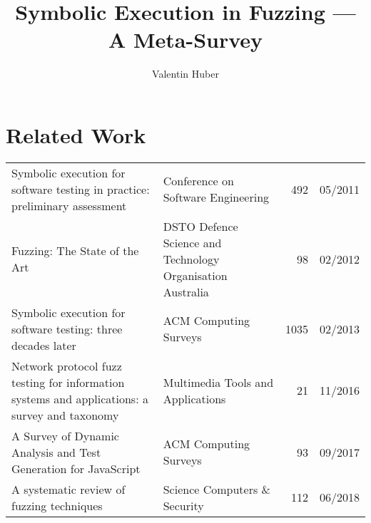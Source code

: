 \documentclass{article}
\title{Symbolic Execution in Fuzzing — A Meta-Survey}
\author{Valentin Huber}
\begin{document}


\maketitle
\tableofcontents
\pagebreak

\section{Related Work}
\begin{longtable}{|P{0.44\textwidth}|P{0.32\textwidth}|r|r|}
    \hline
                                                                                                                            &                                              &  &  \\\hline
    \endhead
    Symbolic execution for software testing in practice: preliminary assessment\cite{PreliminaryAssessment}                                       & Conference on Software Engineering                         & 492            & 05/2011       \\\hline
    Fuzzing: The State of the Art\cite{FuzzingTheStateOfTheArt}                                                                                   & DSTO Defence Science and Technology Organisation Australia & 98             & 02/2012       \\\hline
    Symbolic execution for software testing: three decades later\cite{ReviewThreeDecades}                                                         & ACM Computing Surveys                                      & 1035           & 02/2013       \\\hline
    Network protocol fuzz testing for information systems and applications: a survey and taxonomy\cite{Network}                                   & Multimedia Tools and Applications                          & 21             & 11/2016       \\\hline
    A Survey of Dynamic Analysis and Test Generation for JavaScript                                                                               & ACM Computing Surveys                                      & 93             & 09/2017       \\\hline
    A systematic review of fuzzing techniques\cite{Science}                                                                                       & Science Computers \& Security                              & 112            & 06/2018       \\\hline

\end{longtable}
\end{document}
